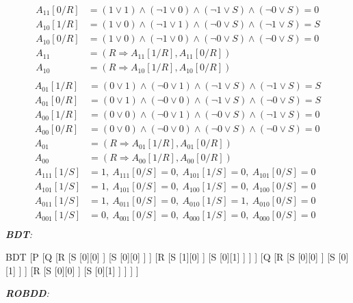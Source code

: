 \documentclass[a4paper,12pt, centered]{article}
\begin{document}
\begin{enumerate}
\begin{align*}
		A_{11}[0/R]&=(1\lor 1)\land(\neg 1\lor 0)\land(\neg 1\lor S)\land (\neg 0\lor S)=0\\
		A_{10}[1/R]&=(1\lor 0)\land(\neg 1\lor 1)\land(\neg 0\lor S)\land (\neg 1\lor S)=S\\
		A_{10}[0/R]&=(1\lor 0)\land(\neg 1\lor 0)\land(\neg 0\lor S)\land (\neg 0\lor S)=0\\
		A_{11}&=(R\Rightarrow A_{11}[1/R],A_{11}[0/R])\\
		A_{10}&=(R\Rightarrow A_{10}[1/R],A_{10}[0/R])\\
	\end{align*}
	\begin{align*}
		A_{01}[1/R]&=(0\lor 1)\land(\neg 0\lor 1)\land(\neg 1\lor S)\land (\neg 1\lor S)=S\\
		A_{01}[0/R]&=(0\lor 1)\land(\neg 0\lor 0)\land(\neg 1\lor S)\land (\neg 0\lor S)=S\\
		A_{00}[1/R]&=(0\lor 0)\land(\neg 0\lor 1)\land(\neg 0\lor S)\land (\neg 1\lor S)=0\\
		A_{00}[0/R]&=(0\lor 0)\land(\neg 0\lor 0)\land(\neg 0\lor S)\land (\neg 0\lor S)=0\\
		A_{01}&=(R\Rightarrow A_{01}[1/R],A_{01}[0/R])\\
		A_{00}&=(R\Rightarrow A_{00}[1/R],A_{00}[0/R])\\
		A_{111}[1/S]&=1,\>A_{111}[0/S]=0,\>A_{101}[1/S]=0,\>A_{101}[0/S]=0\\
		A_{101}[1/S]&=1,\>A_{101}[0/S]=0,\>A_{100}[1/S]=0,\>A_{100}[0/S]=0\\
		A_{011}[1/S]&=1,\>A_{011}[0/S]=0,\>A_{010}[1/S]=1,\>A_{010}[0/S]=0\\
		A_{001}[1/S]&=0,\>A_{001}[0/S]=0,\>A_{000}[1/S]=0,\>A_{000}[0/S]=0\\
	\end{align*}
	\emph{\textbf{BDT}:}\\
	\begin{center}
		\begin{forest}
			BDT
			[P
				[Q
					[R
						[S
							[0][0]
						]
						[S
							[0][0]
						]
					]
					[R
						[S
							[1][0]
						]
						[S
							[0][1]
						]
					]
				]
				[Q
					[R
						[S
							[0][0]
						]
						[S
							[0][1]
						]
					]
					[R
						[S
							[0][0]
						]
						[S
							[0][1]
						]
					]
				]
			]
		\end{forest}
	\end{center}
	\emph{\textbf{ROBDD}:}\\
	\begin{center}

\end{center}
\end{enumerate}
\end{document}

